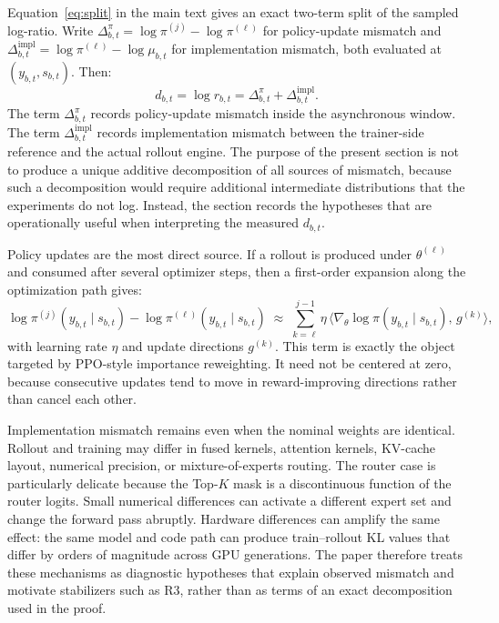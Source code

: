 Equation~\eqref{eq:split} in the main text gives an exact two-term split of the sampled log-ratio. Write $\Delta_{b,t}^{\pi}=\log\pi^{(j)}-\log\pi^{(\ell)}$ for policy-update mismatch and $\Delta_{b,t}^{\mathrm{impl}}=\log\pi^{(\ell)}-\log\mu_{b,t}$ for implementation mismatch, both evaluated at $(y_{b,t},s_{b,t})$. Then:
\begin{equation}
d_{b,t}=\log r_{b,t}=\Delta_{b,t}^{\pi}+\Delta_{b,t}^{\mathrm{impl}}.
\label{eq:app-split}
\end{equation}
The term $\Delta_{b,t}^{\pi}$ records policy-update mismatch inside the asynchronous window. The term $\Delta_{b,t}^{\mathrm{impl}}$ records implementation mismatch between the trainer-side reference and the actual rollout engine. The purpose of the present section is not to produce a unique additive decomposition of all sources of mismatch, because such a decomposition would require additional intermediate distributions that the experiments do not log. Instead, the section records the hypotheses that are operationally useful when interpreting the measured $d_{b,t}$.

Policy updates are the most direct source. If a rollout is produced under $\theta^{(\ell)}$ and consumed after several optimizer steps, then a first-order expansion along the optimization path gives:
\begin{equation}
\log\pi^{(j)}(y_{b,t}\mid s_{b,t})-\log\pi^{(\ell)}(y_{b,t}\mid s_{b,t})
\;\approx\;\sum_{k=\ell}^{j-1}\eta\,\big\langle\nabla_\theta\log\pi(y_{b,t}\mid s_{b,t}),\,g^{(k)}\big\rangle,
\label{eq:taylor-app}
\end{equation}
with learning rate $\eta$ and update directions $g^{(k)}$. This term is exactly the object targeted by PPO-style importance reweighting. It need not be centered at zero, because consecutive updates tend to move in reward-improving directions rather than cancel each other.

Implementation mismatch remains even when the nominal weights are identical. Rollout and training may differ in fused kernels, attention kernels, KV-cache layout, numerical precision, or mixture-of-experts routing. The router case is particularly delicate because the Top-$K$ mask is a discontinuous function of the router logits. Small numerical differences can activate a different expert set and change the forward pass abruptly. Hardware differences can amplify the same effect: the same model and code path can produce train--rollout KL values that differ by orders of magnitude across GPU generations. The paper therefore treats these mechanisms as diagnostic hypotheses that explain observed mismatch and motivate stabilizers such as R3, rather than as terms of an exact decomposition used in the proof.

